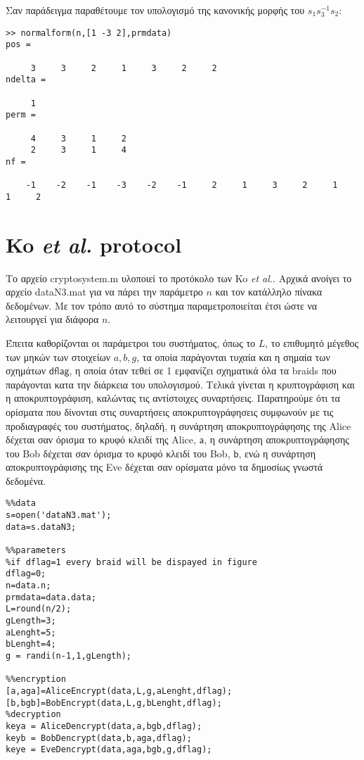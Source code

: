 \documentclass[a4paper,11pt]{article}
\newcommand\ntext[1]{\ensuremath{\mathsf{#1}}}
\begin{document}
Σαν παράδειγμα παραθέτουμε τον υπολογισμό της κανονικής μορφής του $ s_1s_3^{-1}s_2 $:
\begin{lstlisting}
>> normalform(n,[1 -3 2],prmdata)
pos =

     3     3     2     1     3     2     2
ndelta =

     1
perm =

     4     3     1     2
     2     3     1     4
nf =

    -1    -2    -1    -3    -2    -1     2     1     3     2     1     1     2
\end{lstlisting}

\section{Ko \textit{et al.} protocol}

Το αρχείο cryptosystem.m υλοποιεί το προτόκολο των Ko \textit{et al.}. Αρχικά ανοίγει το αρχείο dataN3.mat για να πάρει την παράμετρο $ n $ και τον κατάλληλο πίνακα δεδομένων. Με τον τρόπο αυτό το σύστημα παραμετροποιείται έτσι ώστε να λειτουργεί για διάφορα $ n $.

Έπειτα καθορίζονται οι παράμετροι του συστήματος, όπως το $ L $, το επιθυμητό μέγεθος των μηκών των στοιχείων $ a,b,g $, τα οποία παράγονται τυχαία και η σημαία των σχημάτων \ntext{dflag}, η οποία όταν τεθεί σε 1 εμφανίζει σχηματικά όλα τα braids που παράγονται κατα την διάρκεια του υπολογισμού. 
Τελικά γίνεται η κρυπτογράφιση και η αποκρυπτογράφιση, καλώντας τις αντίστοιχες συναρτήσεις. Παρατηρούμε ότι τα ορίσματα που δίνονται στις συναρτήσεις αποκρυπτογράφησεις συμφωνούν με τις προδιαγραφές του συστήματος, δηλαδή, η συνάρτηση αποκρυπτογράφησης της Alice δέχεται σαν όρισμα το κρυφό κλειδί της Alice, \ntext{a}, η συνάρτηση αποκρυπτογράφησης του Bob δέχεται σαν όρισμα το κρυφό κλειδί του Bob, \ntext{b}, ενώ η συνάρτηση αποκρυπτογράφισης της Eve δέχεται σαν ορίσματα μόνο τα δημοσίως γνωστά δεδομένα.  
\begin{lstlisting}
%%data
s=open('dataN3.mat');
data=s.dataN3;

%%parameters
%if dflag=1 every braid will be dispayed in figure
dflag=0;
n=data.n;
prmdata=data.data;
L=round(n/2);
gLength=3;
aLenght=5;
bLenght=4;
g = randi(n-1,1,gLength);

%%encryption
[a,aga]=AliceEncrypt(data,L,g,aLenght,dflag);
[b,bgb]=BobEncrypt(data,L,g,bLenght,dflag);
%decryption
keya = AliceDencrypt(data,a,bgb,dflag);
keyb = BobDencrypt(data,b,aga,dflag);
keye = EveDencrypt(data,aga,bgb,g,dflag);
\end{lstlisting}
\end{document}
